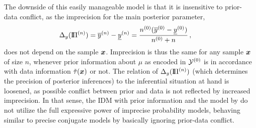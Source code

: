 The downside of this easily manageable model is that it is insensitive to prior-data conflict,
as the imprecision for the main posterior parameter,
\begin{align}
\label{eq:deltay}
\Delta_y(\text{I}\!\Pi^{(n)}) &=  \overline{y}^{(n)} - \underline{y}^{(n)} = \frac{n^{(0)} (\overline{y}^{(0)} - \underline{y}^{(0)})}{n^{(0)} +n}\,,
\end{align}
does not depend on the sample ${\bm x}$.
Imprecision is thus the same for any sample ${\bm x}$ of size $n$,
whenever prior information about $\mu$ as encoded in $\mathcal{Y}^{(0)}$ is in accordance with data information $\tilde{\tau}({\bm x})$ or not.
The relation of $\Delta_y(\text{I}\!\Pi^{(n)})$ (which determines the precision of posterior inferences) to the inferential situation at hand is loosened,
as possible conflict between prior and data is not reflected by increased imprecision.
In that sense, the IDM with prior information and the model by \textcite{2005:quaeghebeurcooman}
do not utilize the full expressive power of imprecise probability models,
behaving similar to precise conjugate models by basically ignoring prior-data conflict.

